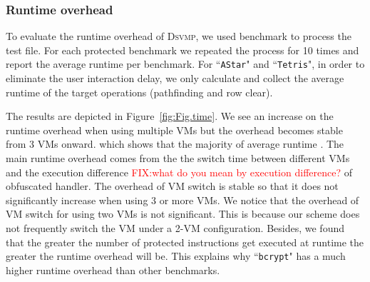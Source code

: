 \documentclass[preprint,12pt,3p]{elsarticle}
\newcommand{\DSVMP}{\textsc{Dsvmp}\xspace}
\newcommand\FIXME[1]{\textcolor{red}{FIX:}\textcolor{red}{#1}}
\begin{document}
\subsubsection{Runtime overhead} 

To evaluate the runtime overhead of \DSVMP, we used benchmark to process the test file.
For each protected benchmark we repeated the process for 10 times and report the average runtime per benchmark.
For ``\texttt{AStar}" and ``\texttt{Tetris}", in order to eliminate the user interaction delay,
we only calculate and collect the average runtime of the target operations (pathfinding and row clear).

The results are depicted in Figure~\ref{fig:Fig.time}. We see an increase on the runtime overhead when 
using multiple VMs but the overhead becomes stable from 3 VMs onward. 
which shows that the majority of average runtime .
The main runtime overhead comes from the the switch time between different VMs
and the execution difference \FIXME{what do you mean by execution difference?} of obfuscated handler.
The overhead of VM switch is stable so that it does not significantly increase when 
using 3 or more VMs. We notice that the overhead of VM switch for using two VMs
is not significant. This is because our scheme does not frequently switch
the VM under a 2-VM configuration. 
Besides, we found that the greater the number of protected instructions get executed at runtime
the greater the runtime overhead will be. 
This explains why ``\texttt{bcrypt}" has a much higher runtime overhead than other benchmarks.



\end{document}
